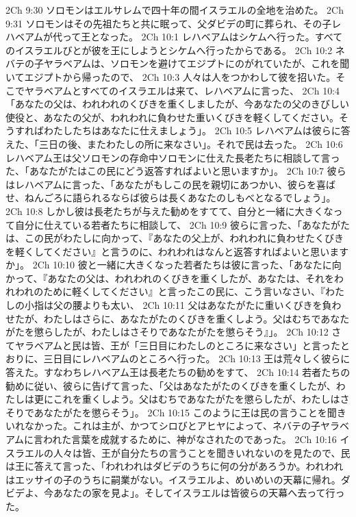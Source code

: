 2Ch 9:30  ソロモンはエルサレムで四十年の間イスラエルの全地を治めた。
2Ch 9:31  ソロモンはその先祖たちと共に眠って、父ダビデの町に葬られ、その子レハベアムが代って王となった。
2Ch 10:1  レハベアムはシケムへ行った。すべてのイスラエルびとが彼を王にしようとシケムへ行ったからである。
2Ch 10:2  ネバテの子ヤラベアムは、ソロモンを避けてエジプトにのがれていたが、これを聞いてエジプトから帰ったので、
2Ch 10:3  人々は人をつかわして彼を招いた。そこでヤラベアムとすべてのイスラエルは来て、レハベアムに言った、
2Ch 10:4  「あなたの父は、われわれのくびきを重くしましたが、今あなたの父のきびしい使役と、あなたの父が、われわれに負わせた重いくびきを軽くしてください。そうすればわたしたちはあなたに仕えましょう」。
2Ch 10:5  レハベアムは彼らに答えた、「三日の後、またわたしの所に来なさい」。それで民は去った。
2Ch 10:6  レハベアム王は父ソロモンの存命中ソロモンに仕えた長老たちに相談して言った、「あなたがたはこの民にどう返答すればよいと思いますか」。
2Ch 10:7  彼らはレハベアムに言った、「あなたがもしこの民を親切にあつかい、彼らを喜ばせ、ねんごろに語られるならば彼らは長くあなたのしもべとなるでしょう」。
2Ch 10:8  しかし彼は長老たちが与えた勧めをすてて、自分と一緒に大きくなって自分に仕えている若者たちに相談して、
2Ch 10:9  彼らに言った、「あなたがたは、この民がわたしに向かって、『あなたの父上が、われわれに負わせたくびきを軽くしてください』と言うのに、われわれはなんと返答すればよいと思いますか」。
2Ch 10:10  彼と一緒に大きくなった若者たちは彼に言った、「あなたに向かって、『あなたの父は、われわれのくびきを重くしたが、あなたは、それをわれわれのために軽くしてください』と言ったこの民に、こう言いなさい、『わたしの小指は父の腰よりも太い、
2Ch 10:11  父はあなたがたに重いくびきを負わせたが、わたしはさらに、あなたがたのくびきを重くしよう。父はむちであなたがたを懲らしたが、わたしはさそりであなたがたを懲らそう』」。
2Ch 10:12  さてヤラベアムと民は皆、王が「三日目にわたしのところに来なさい」と言ったとおりに、三日目にレハベアムのところへ行った。
2Ch 10:13  王は荒々しく彼らに答えた。すなわちレハベアム王は長老たちの勧めをすて、
2Ch 10:14  若者たちの勧めに従い、彼らに告げて言った、「父はあなたがたのくびきを重くしたが、わたしは更にこれを重くしよう。父はむちであなたがたを懲らしたが、わたしはさそりであなたがたを懲らそう」。
2Ch 10:15  このように王は民の言うことを聞きいれなかった。これは主が、かつてシロびとアヒヤによって、ネバテの子ヤラベアムに言われた言葉を成就するために、神がなされたのであった。
2Ch 10:16  イスラエルの人々は皆、王が自分たちの言うことを聞きいれないのを見たので、民は王に答えて言った、「われわれはダビデのうちに何の分があろうか。われわれはエッサイの子のうちに嗣業がない。イスラエルよ、めいめいの天幕に帰れ。ダビデよ、今あなたの家を見よ」。そしてイスラエルは皆彼らの天幕へ去って行った。
